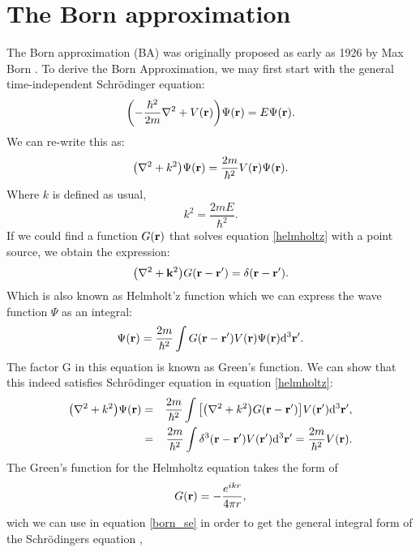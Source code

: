 \section{The Born approximation}\label{bornapproximation}
The Born approximation (BA) was originally proposed as early as 1926 by Max Born \cite{born_approximation}. To derive the Born Approximation, we may first start with the general time-independent Schrödinger equation:
\begin{equation}
	\qty(-\frac{\hbar^2}{2m} \nabla^2 + V(\vb{r}))\Psi(\vb{r}) = E \Psi(\vb{r}) .
\end{equation}
We can re-write this as:
\begin{equation}\label{helmholtz}
	\qty(\nabla^2 + k^2)\Psi(\vb{r}) = \frac{2m}{\hbar^2} V(\vb{r})\Psi(\vb{r}) .
\end{equation}
Where $k$ is defined as usual,
\begin{equation}
	k^2 = \frac{2mE}{\hbar^2}.
\end{equation}
If we could find a function $G(\vb{r})$ that solves equation \ref{helmholtz} with a point source, we obtain the expression:
\begin{equation}
	\qty(\nabla^2 + \vb{k}^2)G( \vb{r} -  \vb{r}') = \delta( \vb{r} -  \vb{r}').
\end{equation}
Which is also known as Helmholt'z function \cite{Griffiths_QM} which we can express the wave function $\Psi$ as an integral:
\begin{equation}\label{general_wave}
	\Psi(\vb{r}) = \frac{2m}{\hbar^2}\int G( \vb{r} -  \vb{r}')V(\vb{r})\Psi(\vb{r})\dd^3\vb{r}'.
\end{equation}
The factor G in this equation is known as Green’s function. We can show that this indeed satisfies Schrödinger equation in equation \ref{helmholtz}:
\begin{alignat}{2}\label{born_se}
	\qty(\nabla^2 + k^2)\Psi(\vb{r})  = && \frac{2m}{\hbar^2}\int \qty[\qty(\nabla^2 + k^2)G( \vb{r} -  \vb{r}')]V(\vb{r'})\dd^3\vb{r}', \\ 
  = && \frac{2m}{\hbar^2} \int \delta^3(\vb{r} - \vb{r}')V(\vb{r}')\dd^3\vb{r}'  =  \frac{2m}{\hbar^2}V(\vb{r}).
\end{alignat}
The Green's function for the Helmholtz equation takes the form of \cite{Griffiths_QM}
\begin{equation}
	G(\vb{r}) = -\frac{e^{ikr}}{4\pi r},
\end{equation}
wich we can use in equation \ref{born_se} in order to get the general integral form of the Schrödingers equation \cite{Griffiths_QM},

